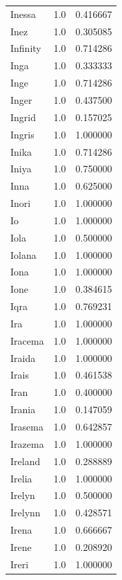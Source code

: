 \documentclass[
  letterpaper,
  DIV=11,
  numbers=noendperiod]{scrreprt}
\begin{document}
\begin{tabular}{lrr}
Inessa          &   1.0 &   0.416667 \\
Inez            &   1.0 &   0.305085 \\
Infinity        &   1.0 &   0.714286 \\
Inga            &   1.0 &   0.333333 \\
Inge            &   1.0 &   0.714286 \\
Inger           &   1.0 &   0.437500 \\
Ingrid          &   1.0 &   0.157025 \\
Ingris          &   1.0 &   1.000000 \\
Inika           &   1.0 &   0.714286 \\
Iniya           &   1.0 &   0.750000 \\
Inna            &   1.0 &   0.625000 \\
Inori           &   1.0 &   1.000000 \\
Io              &   1.0 &   1.000000 \\
Iola            &   1.0 &   0.500000 \\
Iolana          &   1.0 &   1.000000 \\
Iona            &   1.0 &   1.000000 \\
Ione            &   1.0 &   0.384615 \\
Iqra            &   1.0 &   0.769231 \\
Ira             &   1.0 &   1.000000 \\
Iracema         &   1.0 &   1.000000 \\
Iraida          &   1.0 &   1.000000 \\
Irais           &   1.0 &   0.461538 \\
Iran            &   1.0 &   0.400000 \\
Irania          &   1.0 &   0.147059 \\
Irasema         &   1.0 &   0.642857 \\
Irazema         &   1.0 &   1.000000 \\
Ireland         &   1.0 &   0.288889 \\
Irelia          &   1.0 &   1.000000 \\
Irelyn          &   1.0 &   0.500000 \\
Irelynn         &   1.0 &   0.428571 \\
Irena           &   1.0 &   0.666667 \\
Irene           &   1.0 &   0.208920 \\
Ireri           &   1.0 &   1.000000 \\

\end{tabular}
\end{document}

